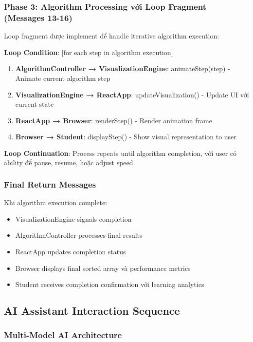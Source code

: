 \subsubsection{Phase 3: Algorithm Processing với Loop Fragment (Messages 13-16)}

Loop fragment được implement để handle iterative algorithm execution:

\textbf{Loop Condition}: [for each step in algorithm execution]

\begin{enumerate}
    \item \textbf{AlgorithmController → VisualizationEngine}: animateStep(step) - Animate current algorithm step
    \item \textbf{VisualizationEngine → ReactApp}: updateVisualization() - Update UI với current state
    \item \textbf{ReactApp → Browser}: renderStep() - Render animation frame
    \item \textbf{Browser → Student}: displayStep() - Show visual representation to user
\end{enumerate}

\textbf{Loop Continuation}: Process repeats until algorithm completion, với user có ability để pause, resume, hoặc adjust speed.

\subsubsection{Final Return Messages}

Khi algorithm execution complete:
\begin{itemize}
    \item VisualizationEngine signals completion
    \item AlgorithmController processes final results
    \item ReactApp updates completion status
    \item Browser displays final sorted array và performance metrics
    \item Student receives completion confirmation với learning analytics
\end{itemize}

\subsection{AI Assistant Interaction Sequence}
\label{subsec:ai-interaction-sequence}

\subsubsection{Multi-Model AI Architecture}

